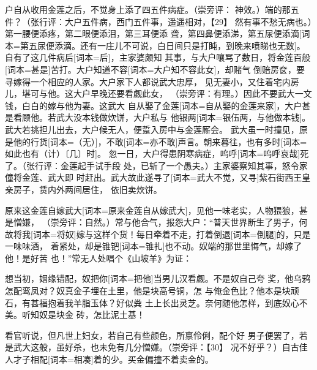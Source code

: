 \documentclass[UTF8,scheme=chinese,11pt,linespread=1.4]{ctexbook}
\makeatletter
\newcommand{\banben}[2][]{#2}
\newenvironment{diben}[1]
  {\list{}{\listparindent 2em
    \itemindent\listparindent
    \rightmargin 0em  %
    \leftmargin 0em  %
    \parsep \z@ \@plus\p@}%
   \item\relax}
  {\endlist}
\makeatother
\begin{document}
\begin{diben}
大户自从收用金莲之后，不觉身上添了四五件病症。（崇旁评：
神效。）端的那五件？（张行评：大户五件病，西门五件事，遥遥相对，【29】
然有事不愁无病也。）第一腰便添疼，第二眼便添泪，第三耳便添
聋，第四鼻便添涕，\banben{第五尿便添滴}[词本={第五尿便添滴。还有一庄儿不可说，白日间只是打盹，到晚来喷睇也无数}]。\banben{自有了这几件病后}[词本={后}]，主家婆颇知
其事，与大户嚷骂了数日，将金莲\banben{百般}[词本={甚是}]苦打。\banben{大户知道不容}[词本={大户知不容此女}]，却赌气
倒赔房奁，要寻嫁得一个相应的人家。大户家下人都说武大忠厚，
见无妻小，又住着宅内房儿，堪可与他。这大户早晚还要看觑此女，
（崇旁评：有理。）因此不要武大一文钱，白白的嫁与他为妻。这武大
\banben{自从娶了金莲}[词本={自从娶的金莲来家}]，大户甚是看顾他。若武大没本钱做炊饼，大户私与
他\banben{银两}[词本={银伍两，与他做本钱}]。武大若挑担儿出去，大户候无人，便踅入房中与金莲厮会。
武大虽一时撞见，\banben{原是他的行货}[词本={（无）}]，\banben{不敢}[词本={亦不敢}]声言。朝来暮往，\banben{也有多时}[词本={如此也有（计）〔几〕时}]。
忽一日，大户得患阴寒病症，\banben{呜呼}[词本={呜呼哀哉}]死了。（张行评：金莲起手试手段
处，已斩了一个愚夫。）主家婆察知其事，怒令家僮将金莲、武大即
时赶出。\banben{武大故此遂寻了}[词本={武大不觉，又寻}]紫石街西王皇亲房子，赁内外两间居住，
依旧卖炊饼。

\banben{原来这金莲自嫁武大}[词本={原来金莲自从嫁武大}]，见他一味老实，人物猥狼，甚是憎嫌，
（崇旁评：自然。）常与他合气，报怨大户：“普天世界断生了男子，何
故\banben{将我}[词本={将奴}]嫁与这样个货！每日牵着不走，打着\banben{倒退}[词本={倒腿}]的，只是一味味酒，
着紧处，却是\banben{锥钯}[词本={锥扎}]也不动。奴端的那世里悔气，却嫁了他！是好苦
也！”常无人处唱个《山坡羊》为证：

想当初，姻缘错配，奴\banben{把你}[词本={把他}]当男儿汉看觑。不是奴自己夸
奖，他乌鸦怎配鸾凤对？奴真金子埋在土里，他是块高号铜，怎
与俺金色比？他本是块顽石，有甚福抱着我羊脂玉体？好似粪
土上长出灵芝。奈何随他怎样，到底奴心不美。听知奴是块金
砖，怎比泥土基！

看官听说，但凡世上妇女，若自己有些颜色，所禀伶俐，配个好
男子便罢了，若是武大这般，虽好杀，也未免有几分憎嫌。（崇旁评：【30】
况不好乎？）自古佳人才子\banben{相配}[词本={相凑}]着的少。买金偏撞不着卖金的。


\end{diben}
\end{document}
